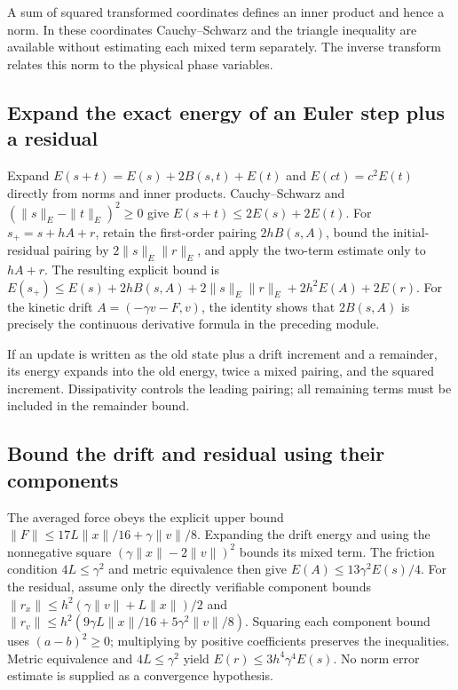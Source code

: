 \documentclass[11pt,a4paper]{report}
\begin{document}
A sum of squared transformed coordinates defines an inner product and hence a norm. In these coordinates Cauchy–Schwarz and the triangle inequality are available without estimating each mixed term separately. The inverse transform relates this norm to the physical phase variables.

\subsection{\texorpdfstring{Expand the exact energy of an Euler step plus a residual}{Expand the exact energy of an Euler step plus a residual}}
\label{report-step-KineticLangevin-OBABORemainder-lean-2}


Expand \(E(s+t)=E(s)+2B(s,t)+E(t)\) and \(E(ct)=c^2E(t)\) directly from norms and inner products. Cauchy–Schwarz and \((\|s\|_E-\|t\|_E)^2\ge0\) give \(E(s+t)\le2E(s)+2E(t)\). For \(s_{+}=s+hA+r\), retain the first-order pairing \(2hB(s,A)\), bound the initial-residual pairing by \(2\|s\|_E\|r\|_E\), and apply the two-term estimate only to \(hA+r\). The resulting explicit bound is \(E(s_+)\le E(s)+2hB(s,A)+2\|s\|_E\|r\|_E+2h^2E(A)+2E(r)\). For the kinetic drift \(A=(-\gamma v-F,v)\), the identity shows that \(2B(s,A)\) is precisely the continuous derivative formula in the preceding module.



If an update is written as the old state plus a drift increment and a remainder, its energy expands into the old energy, twice a mixed pairing, and the squared increment. Dissipativity controls the leading pairing; all remaining terms must be included in the remainder bound.

\subsection{\texorpdfstring{Bound the drift and residual using their components}{Bound the drift and residual using their components}}
\label{report-step-KineticLangevin-OBABORemainder-lean-3}


The averaged force obeys the explicit upper bound \(\|F\|\le17L\|x\|/16+\gamma\|v\|/8\). Expanding the drift energy and using the nonnegative square \((\gamma\|x\|-2\|v\|)^2\) bounds its mixed term. The friction condition \(4L\le\gamma^2\) and metric equivalence then give \(E(A)\le13\gamma^2E(s)/4\). For the residual, assume only the directly verifiable component bounds \(\|r_x\|\le h^2(\gamma\|v\|+L\|x\|)/2\) and \(\|r_v\|\le h^2(9\gamma L\|x\|/16+5\gamma^2\|v\|/8)\). Squaring each component bound uses \((a-b)^2\ge0\); multiplying by positive coefficients preserves the inequalities. Metric equivalence and \(4L\le\gamma^2\) yield \(E(r)\le3h^4\gamma^4E(s)\). No norm error estimate is supplied as a convergence hypothesis.
\end{document}
